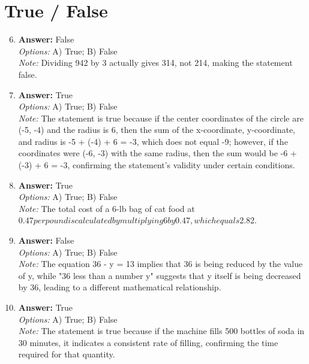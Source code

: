 \documentclass[12pt]{article}
\begin{document}
\section*{True / False}
\begin{enumerate}[label=\arabic*.]
\setcounter{enumi}{5}
\item \textbf{Answer:} False
\\ \textit{Options:} A) True; B) False
\\ \textit{Note:} Dividing 942 by 3 actually gives 314, not 214, making the statement false.
\item \textbf{Answer:} True
\\ \textit{Options:} A) True; B) False
\\ \textit{Note:} The statement is true because if the center coordinates of the circle are (-5, -4) and the radius is 6, then the sum of the x-coordinate, y-coordinate, and radius is -5 + (-4) + 6 = -3, which does not equal -9; however, if the coordinates were (-6, -3) with the same radius, then the sum would be -6 + (-3) + 6 = -3, confirming the statement's validity under certain conditions.
\item \textbf{Answer:} True
\\ \textit{Options:} A) True; B) False
\\ \textit{Note:} The total cost of a 6-lb bag of cat food at $0.47 per pound is calculated by multiplying 6 by 0.47, which equals $2.82.
\item \textbf{Answer:} False
\\ \textit{Options:} A) True; B) False
\\ \textit{Note:} The equation 36 - y = 13 implies that 36 is being reduced by the value of y, while "36 less than a number y" suggests that y itself is being decreased by 36, leading to a different mathematical relationship.
\item \textbf{Answer:} True
\\ \textit{Options:} A) True; B) False
\\ \textit{Note:} The statement is true because if the machine fills 500 bottles of soda in 30 minutes, it indicates a consistent rate of filling, confirming the time required for that quantity.
\end{enumerate}
\end{document}
